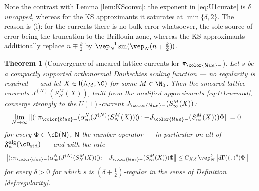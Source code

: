 \documentclass[a4paper, 11pt]{article}
\newcommand{\ua}{\textup a}
\newcommand{\fF}{\mathfrak{F}}\newcommand{\cF}{\mathcal{F}}\newcommand{\dF}{\mathds{F}}\newcommand{\sF}{\mathscr{F}}
\newcommand{\fl}{\mathfrak{l}}\newcommand{\cl}{\mathcal{l}}
\DeclareMathOperator{\1}{\mathds{1}}
\DeclareMathOperator{\std}{std}
\DeclareMathOperator{\alg}{alg}
\newtheorem{thm}{Theorem} [section]
\newcommand{\Nop}{\mathsf{N}}
\begin{document}
Note the contrast with Lemma \ref{lem:KSconvc}: the exponent in \eqref{eq:U1curate} is $\delta$ \emph{uncapped}, whereas for the KS approximants it saturates at $\min\{\delta,2\}$. The reason is (i): for the currents there is no bulk error whatsoever, the sole source of error being the truncation to the Brillouin zone, whereas the KS approximants additionally replace $n\mp\tfrac{k}{2}$ by $\vep_{N}^{-1}\sin(\vep_{N}(n\mp\tfrac{k}{2}))$.

\begin{thm}[Convergence of smeared lattice currents for $\pi_{{\color{blue}-}}$]
\label{thm:U1cursmearedconv}
Let $s$ be a compactly supported orthonormal Daubechies scaling function --- \emph{no regularity is required} --- and let $X\in\fl(\Lambda_{M},\C)$ for some $M\in\N_{0}$. Then the smeared lattice currents $J^{(N)}(S^{M}_{N}(X))$, built from the modified approximants \eqref{eq:U1curmod}, converge strongly to the $U(1)$-current $J_{{\color{blue}-}}(S^{M}_{\infty}(X))$:
\begin{align}
\label{eq:U1curconvsmeared}
\lim_{N\rightarrow\infty}\|(:\!\pi_{{\color{blue}-}}(\alpha^{N}_{\infty}(J^{(N)}(S^{M}_{N}(X)))\!)\!: - J_{{\color{blue}-}}(S^{M}_{\infty}(X)))\Phi\| & = 0
\end{align}
for every $\Phi\in\cD(\Nop)$, $\Nop$ the number operator --- in particular on all of $\fF^{\alg}_{\ua}(\cD_{\std})$ --- and with the rate
\begin{align}
\label{eq:U1curconvrate}
\big\|(:\!\pi_{{\color{blue}-}}(\alpha^{N}_{\infty}(J^{(N)}(S^{M}_{N}(X)))\!)\!: - J_{{\color{blue}-}}(S^{M}_{\infty}(X)))\Phi\big\| & \leq C_{X,\delta}\!\ \vep_{N}^{\delta}\big\|d\Gamma(\langle\!\ .\!\ \rangle^{\delta})\Phi\big\|
\end{align}
for every $\delta>0$ for which $s$ is $(\delta+\tfrac{1}{2})$-regular in the sense of Definition \ref{def:regularity}.
\end{thm}
\end{document}
